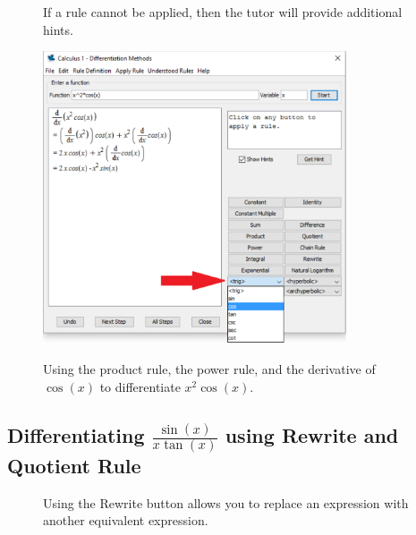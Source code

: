 \begin{figure}[h]
\caption{If a rule cannot be applied, then the tutor will provide additional hints.}
\centering
{}
\end{figure}

\clearpage

\begin{figure}[h]
\caption{Using the product rule, the power rule, and the derivative of $\cos(x)$ to differentiate $x^2\cos(x)$.}
\centering
\includegraphics[width=0.8\textwidth]{tutorials/figures/DiffTutorQ1-4-eps-converted-to.pdf}\\
\end{figure}

\subsection{Differentiating $\frac{\sin(x)}{x\tan(x)}$ using Rewrite and Quotient Rule}

\begin{figure}[h]
\caption{Using the Rewrite button allows you to replace an expression with another equivalent expression.}
\centering
{}
\end{figure}

